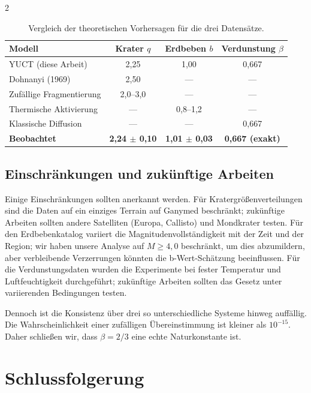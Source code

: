 \documentclass[11pt,a4paper]{article}
\newcommand{\betaf}{\beta}
\begin{document}
\begin{multicols}{2}
		\begin{table}[htbp]
			\centering
			\caption{Vergleich der theoretischen Vorhersagen für die drei Datensätze.}
			\label{tab:comparison2}
			\begin{tabular}{lccc}
				\toprule
				\textbf{Modell} & \textbf{Krater $q$} & \textbf{Erdbeben $b$} & \textbf{Verdunstung $\beta$} \\
				\midrule
				YUCT (diese Arbeit) & 2,25 & 1,00 & 0,667 \\
				Dohnanyi (1969) & 2,50 & — & — \\
				Zufällige Fragmentierung & 2,0–3,0 & — & — \\
				Thermische Aktivierung & — & 0,8–1,2 & — \\
				Klassische Diffusion & — & — & 0,667 \\
				\textbf{Beobachtet} & \textbf{2,24 $\pm$ 0,10} & \textbf{1,01 $\pm$ 0,03} & \textbf{0,667 (exakt)} \\
				\bottomrule
			\end{tabular}
		\end{table}
		
		\subsection{Einschränkungen und zukünftige Arbeiten}
		
		Einige Einschränkungen sollten anerkannt werden. Für Kratergrößenverteilungen sind die Daten auf ein einziges Terrain auf Ganymed beschränkt; zukünftige Arbeiten sollten andere Satelliten (Europa, Callisto) und Mondkrater testen. Für den Erdbebenkatalog variiert die Magnitudenvollständigkeit mit der Zeit und der Region; wir haben unsere Analyse auf \(M \ge 4,0\) beschränkt, um dies abzumildern, aber verbleibende Verzerrungen könnten die b-Wert-Schätzung beeinflussen. Für die Verdunstungsdaten wurden die Experimente bei fester Temperatur und Luftfeuchtigkeit durchgeführt; zukünftige Arbeiten sollten das Gesetz unter variierenden Bedingungen testen.
		
		Dennoch ist die Konsistenz über drei so unterschiedliche Systeme hinweg auffällig. Die Wahrscheinlichkeit einer zufälligen Übereinstimmung ist kleiner als \(10^{-15}\). Daher schließen wir, dass \(\betaf = 2/3\) eine echte Naturkonstante ist.
		
		\section{Schlussfolgerung}
		

\end{multicols}
\end{document}
